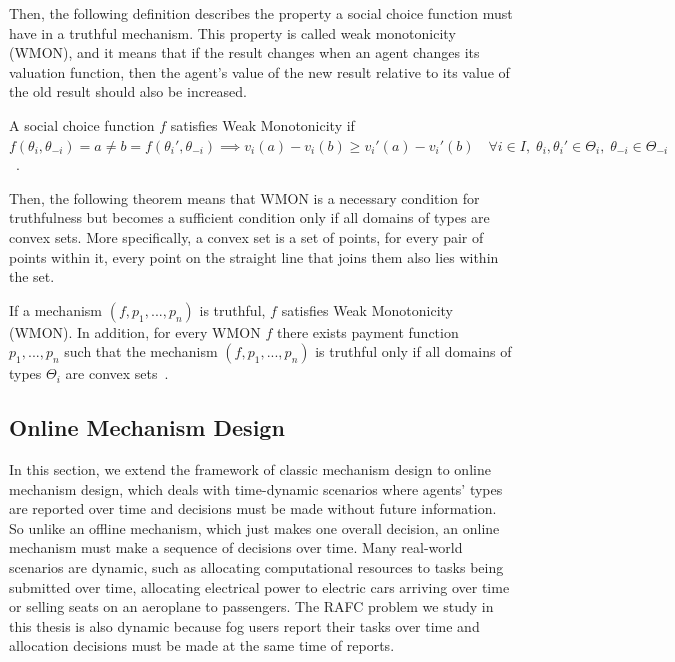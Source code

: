 \documentclass[11pt]{phdthesis}
\begin{document}
Then, the following definition describes the property a social choice function must have in a truthful mechanism. This property is called weak monotonicity (WMON), and it means that if the result changes when an agent changes its valuation function, then the agent's value of the new result relative to its value of the old result should also be increased.
\begin{definition}
	A social choice function $f$ satisfies Weak Monotonicity if $ f(\theta_i, \theta_{-i}) = a \neq b = f(\theta_i', \theta_{-i}) \implies v_i(a) - v_i(b) \geq v_i'(a) - v_i'(b) \quad \forall i \in I, \;  \theta_i,\theta_{i}' \in \Theta_i, \; \theta_{-i} \in \Theta_{-i} $~\citep[Definition 9.28]{nisan2007algorithmic}.
\end{definition}

Then, the following theorem means that WMON is a necessary condition for truthfulness but becomes a sufficient condition only if all domains of types are convex sets. More specifically, a convex set is a set of points, for every pair of points within it, every point on the straight line that joins them also lies within the set.

\begin{theorem}
	If a mechanism $(f,p_1,...,p_n)$ is truthful, $f$ satisfies Weak Monotonicity (WMON). In addition, for every WMON $f$ there exists payment function $p_1,...,p_n$ such that the mechanism $(f,p_1,...,p_n)$ is truthful only if all domains of types $\Theta_i$ are convex sets~\citep[Theorem 9.29]{nisan2007algorithmic}.
\end{theorem}


\subsection{Online Mechanism Design} \label{online mechanism design}

In this section, we extend the framework of classic mechanism design to online mechanism design, which deals with time-dynamic scenarios where agents' types are reported over time and decisions must be made without future information. So unlike an offline mechanism, which just makes one overall decision, an online mechanism must make a sequence of decisions over time. 
Many real-world scenarios are dynamic, such as allocating computational resources to tasks being submitted over time, allocating electrical power to electric cars arriving over time or selling seats on an aeroplane to passengers. 
The RAFC problem we study in this thesis is also dynamic because fog users report their tasks over time and allocation decisions must be made at the same time of reports.
\end{document}
